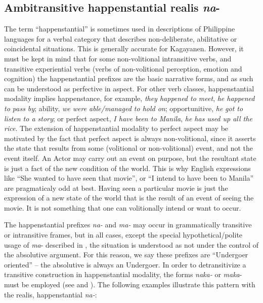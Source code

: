 \subsection{Ambitransitive happenstantial realis \textit{na}{}-}
\label{bkm:Ref107902303}
\label{sec:ambitransitivehappenstantialrealis}
The term “happenstantial” is sometimes used in descriptions of Philippine languages for a verbal category that describes non-deliberate, abilitative or coincidental situations. This is generally accurate for Kagayanen. However, it must be kept in mind that for some non-volitional intransitive verbs, and transitive experiential verbs (verbs of non-volitional perception, emotion and cognition) the happenstantial prefixes are the basic narrative forms, and as such can be understood as perfective in aspect. For other verb classes, happenstantial modality implies happenstance, for example, \textit{they happened to meet}, \textit{he happened to pass by}; ability, \textit{we were able/managed to hold on}; opportunitive, \textit{he} \textit{got to listen to a story}; or perfect aspect, \textit{I have been to Manila}, \textit{he has used up all the rice}. The extension of happenstantial modality to perfect aspect may be motivated by the fact that perfect aspect is always non-volitional, since it asserts the state that results from some (volitional or non-volitional) event, and not the event itself. An Actor may carry out an event on purpose, but the resultant state is just a fact of the new condition of the world. This is why English expressions like “She wanted to have seen that movie”, or “I intend to have been to Manila” are pragmaticaly odd at best. Having seen a particular movie is just the expression of a new state of the world that is the result of an event of seeing the movie. It is not something that one can volitionally intend or want to occur.

The happenstantial prefixes \textit{na-} and \textit{ma-} may occur in grammatically transitive or intransitive frames, but in all cases, except the special hypothetical/polite usage of \textit{ma}{}- described in , the situation is understood as not under the control of the absolutive argument. For this reason, we say these prefixes are “Undergoer oriented” – the absolutive is always an Undergoer. In order to detransitivize a transitive construction in happenstantial modality, the forms \textit{naka-} or \textit{maka}{}- must be employed (see  and ). The following examples illustrate this pattern with the realis, happenstantial \textit{na-}:

